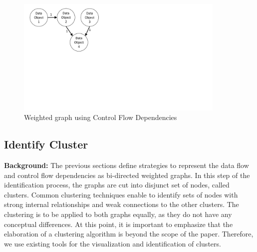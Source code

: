 \begin{figure}[h!]
	\centering
	\includegraphics[width=10cm, trim={1.5cm 9.5cm 16.0cm 0cm}]{img/DataFlowGraph.pdf}
	\caption{Weighted graph using Control Flow Dependencies}
	\label{fig:dataFlowGraph}
\end{figure}








\subsection{Identify Cluster}
\label{sec:Solution:IdentifyCluster}
\textbf{Background:} The previous sections define strategies to represent the data flow and control flow dependencies as bi-directed weighted graphs. In this step of the identification process, the graphs are cut into disjunct set of nodes, called clusters. Common clustering techniques enable to identify sets of nodes with strong internal relationships and weak connections to the other clusters. The clustering is to be applied to both graphs equally, as they do not have any conceptual differences. At this point, it is important to emphasize that the elaboration of a clustering algorithm is beyond the scope of the paper. Therefore, we use existing tools for the visualization and identification of clusters. \\

